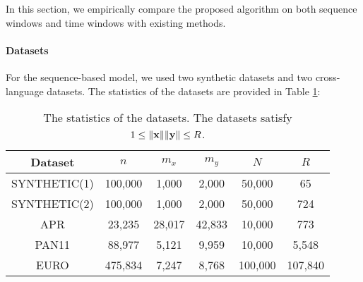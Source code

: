 In this section, we empirically compare the proposed algorithm on both sequence windows and time windows with existing methods.
\paragraph{Datasets} For the sequence-based model, we used two synthetic datasets and two cross-language datasets. The statistics of the datasets are provided in Table \ref{table:statistics}:

\begin{table}[t]
    \centering
    \caption{The statistics of the datasets. The datasets satisfy $1 \leq \|{\bf{x}}\|\|{\bf{y}}\| \leq R $.}
    \label{table:statistics}
    \begin{tabular}{|c|c|c|c|c|c|}
    \hline
        Dataset & $n$ & $m_x$ & $m_y$ & $N$ & $R$ \\ \hline
        SYNTHETIC(1) & 100,000 & 1,000 & 2,000 & 50,000 & 65 \\ \hline
        SYNTHETIC(2) & 100,000 & 1,000 & 2,000 & 50,000 & 724 \\ \hline
        APR & 23,235 & 28,017 & 42,833 & 10,000 & 773 \\ \hline
        PAN11 & 88,977 & 5,121 & 9,959 & 10,000 & 5,548 \\ \hline
        EURO & 475,834 & 7,247 & 8,768 & 100,000 & 107,840 \\ \hline
    \end{tabular}
\end{table}

